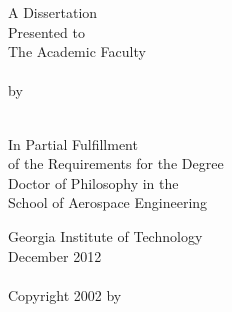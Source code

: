 \thispagestyle{empty}

\begin{center}
  \begin{singlespace}
    {\large\bfseries\MakeUppercase{\thetitle}}
    
    \vfill
    
    A Dissertation\\
    Presented to\\
    The Academic Faculty\\
    \ \\
    by\\
    \ \\
    \theauthor

    \vfill

    In Partial Fulfillment\\
    of the Requirements for the Degree\\
    Doctor of Philosophy in the\\
    School of Aerospace Engineering

    \vfill

    Georgia Institute of Technology\\
    December 2012\\
    \ \\
    Copyright 2002 by \theauthor

  \end{singlespace}
\end{center}

